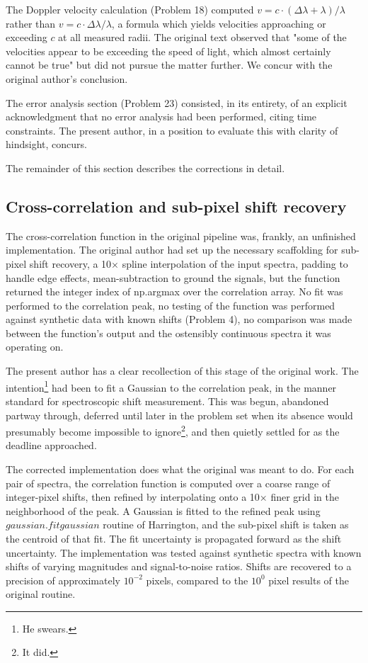 \documentclass{aa}
\begin{document}
    The Doppler velocity calculation (Problem 18) computed $v = c \cdot (\Delta\lambda + \lambda) / \lambda$ rather than $v = c\cdot\Delta\lambda / \lambda$, a formula which yields velocities approaching or exceeding $c$ at all measured radii. The original text observed that "some of the velocities appear to be exceeding the speed of light, which almost certainly cannot be true" but did not pursue the matter further. We concur with the original author's conclusion.

    The error analysis section (Problem 23) consisted, in its entirety, of an explicit acknowledgment that no error analysis had been performed, citing time constraints. The present author, in a position to evaluate this with clarity of hindsight, concurs.

    The remainder of this section describes the corrections in detail.

   \subsection{Cross-correlation and sub-pixel shift recovery}\label{meth_cross_corr}

   The cross-correlation function in the original pipeline was, frankly, an unfinished implementation. The original author had set up the necessary scaffolding for sub-pixel shift recovery, a 10× spline interpolation of the input spectra, padding to handle edge effects, mean-subtraction to ground the signals, but the function returned the integer index of np.argmax over the correlation array. No fit was performed to the correlation peak, no testing of the function was performed against synthetic data with known shifts (Problem 4), no comparison was made between the function's output and the ostensibly continuous spectra it was operating on.

    The present author has a clear recollection of this stage of the original work. The intention\footnote{He swears.} had been to fit a Gaussian to the correlation peak, in the manner standard for spectroscopic shift measurement. This was begun, abandoned partway through, deferred until later in the problem set when its absence would presumably become impossible to ignore\footnote{It did.}, and then quietly settled for as the deadline approached.

    The corrected implementation does what the original was meant to do. For each pair of spectra, the correlation function is computed over a coarse range of integer-pixel shifts, then refined by interpolating onto a 10× finer grid in the neighborhood of the peak. A Gaussian is fitted to the refined peak using $gaussian.fitgaussian$ routine of Harrington, and the sub-pixel shift is taken as the centroid of that fit. The fit uncertainty is propagated forward as the shift uncertainty. The implementation was tested against synthetic spectra with known shifts of varying magnitudes and signal-to-noise ratios. Shifts are recovered to a precision of approximately $10^{-2}$ pixels, compared to the $10^{0}$ pixel results of the original routine.
\end{document}
